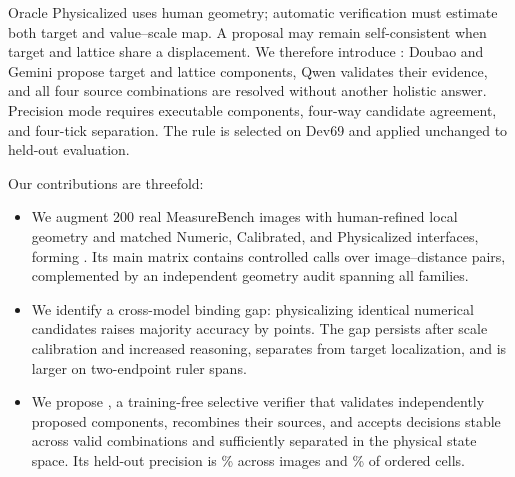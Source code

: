 Oracle Physicalized uses human geometry; automatic verification must estimate both target and value--scale map. A proposal may remain self-consistent when target and lattice share a displacement. We therefore introduce \factorial{}: Doubao and Gemini propose target and lattice components, Qwen validates their evidence, and all four source combinations are resolved without another holistic answer. Precision mode requires executable components, four-way candidate agreement, and four-tick separation. The rule is selected on Dev69 and applied unchanged to held-out evaluation.

Our contributions are threefold:
\begin{itemize}
  \item We augment 200 real MeasureBench images with human-refined local geometry and matched Numeric, Calibrated, and Physicalized interfaces, forming \dataset{}. Its main matrix contains \FormalCalls{} controlled calls over \ImageDistancePairs{} image--distance pairs, complemented by an independent geometry audit spanning all \GeometryAuditFamilies{} families.
  \item We identify a cross-model binding gap: physicalizing identical numerical candidates raises majority accuracy by \MajorityBalancedGain{} points. The gap persists after scale calibration and increased reasoning, separates from target localization, and is larger on two-endpoint ruler spans.
  \item We propose \factorial{}, a training-free selective verifier that validates independently proposed components, recombines their sources, and accepts decisions stable across valid combinations and sufficiently separated in the physical state space. Its held-out precision is \FactorialTestPrecision\% across \FactorialTestImages{} images and \FactorialTestCoverage\% of ordered cells.
\end{itemize}
